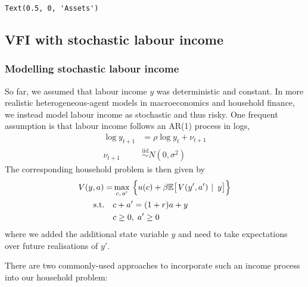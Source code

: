 \documentclass{scrartcl}
\makeatletter
\newcommand{\boxspacing}{\kern\kvtcb@left@rule\kern\kvtcb@boxsep}
\newcommand{\prompt}[4]{
        {\ttfamily\llap{{\color{#2}[#3]:\hspace{3pt}#4}}\vspace{-\baselineskip}}
    }
\makeatother
\begin{document}
            \begin{tcolorbox}[breakable, size=fbox, boxrule=.5pt, pad at break*=1mm, opacityfill=0]
\prompt{Out}{outcolor}{11}{\boxspacing}
\begin{Verbatim}[commandchars=\\\{\}]
Text(0.5, 0, 'Assets')
\end{Verbatim}
\end{tcolorbox}
        
    \begin{center}
    \end{center}
    
    \hypertarget{vfi-with-stochastic-labour-income}{%
\subsection{VFI with stochastic labour
income}\label{vfi-with-stochastic-labour-income}}

\hypertarget{modelling-stochastic-labour-income}{%
\subsubsection{Modelling stochastic labour
income}\label{modelling-stochastic-labour-income}}

So far, we assumed that labour income \(y\) was deterministic and
constant. In more realistic heterogeneous-agent models in macroeconomics
and household finance, we instead model labour income as stochastic and
thus risky. One frequent assumption is that labour income follows an
AR(1) process in logs, \ie \[
\begin{aligned}
    \log y_{t+1} &= \rho \log y_t + \nu_{t+1} \\
    \nu_{t+1} &\stackrel{\text{iid}}{\sim} N(0, \sigma^2)
\end{aligned}
\] The corresponding household problem is then given by \[
\begin{aligned}
V(y,a) = &\max_{c,\,a'}~\Bigl\{ u(c)
    + \beta \mathbb{E}\bigl[\left.V(y',a')~\right|~ y\bigr] \Bigr\} \\
    \text{s.t.} \quad &c + a' = (1+r)a  + y \\
    & c \geq 0,\; a' \geq 0
\end{aligned}
\] where we added the additional state variable \(y\) and need to take
expectations over future realisations of \(y'\).

There are two commonly-used approaches to incorporate such an income
process into our household problem:
\end{document}
